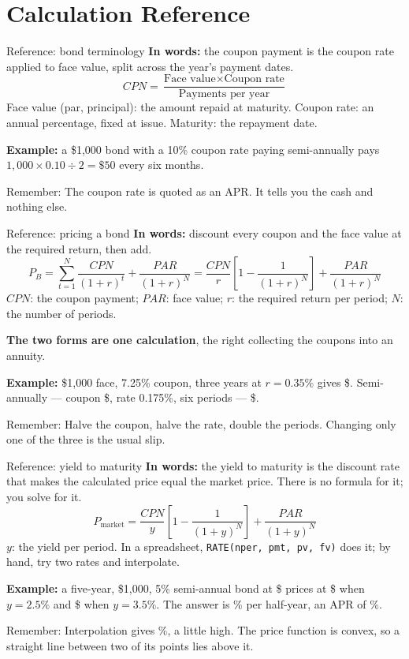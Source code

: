 \documentclass[10pt,aspectratio=169]{beamer}
\newcommand{\remember}[1]{\par\smallskip\alert{Remember:} #1}
\begin{document}
\section{Calculation Reference}

\begin{frame}[label=bondterms]{Reference: bond terminology}
\textbf{In words:} the coupon payment is the coupon rate applied to face value, split across the year's payment dates.
\[
CPN=\frac{\text{Face value}\times\text{Coupon rate}}{\text{Payments per year}}
\]
Face value (par, principal): the amount repaid at maturity. Coupon rate: an annual percentage, fixed at issue. Maturity: the repayment date.
\par\smallskip
\textbf{Example:} a \$1,000 bond with a 10\% coupon rate paying semi-annually pays $1{,}000\times0.10\div2=\$50$ every six months.
\remember{The coupon rate is quoted as an APR. It tells you the cash and nothing else.}
\end{frame}

\begin{frame}[label=bondprice]{Reference: pricing a bond}
\textbf{In words:} discount every coupon and the face value at the required return, then add.
\[
P_B=\sum_{t=1}^{N}\frac{CPN}{(1+r)^t}+\frac{PAR}{(1+r)^N}
=\frac{CPN}{r}\left[1-\frac{1}{(1+r)^N}\right]+\frac{PAR}{(1+r)^N}
\]
$CPN$: the coupon payment; $PAR$: face value; $r$: the required return per period; $N$: the number of periods.
\par\smallskip
\textbf{The two forms are one calculation}, the right collecting the coupons into an annuity.
\par\smallskip
\textbf{Example:} \$1,000 face, 7.25\% coupon, three years at $r=0.35\%$ gives \$\LExOnePrice. Semi-annually --- coupon \$\LExOneCouponSemi, rate 0.175\%, six periods --- \$\LExOnePriceSemi.
\remember{Halve the coupon, halve the rate, double the periods. Changing only one of the three is the usual slip.}
\end{frame}

\begin{frame}[label=ytm]{Reference: yield to maturity}
\textbf{In words:} the yield to maturity is the discount rate that makes the calculated price equal the market price. There is no formula for it; you solve for it.
\[
P_{\text{market}}=\frac{CPN}{y}\left[1-\frac{1}{(1+y)^N}\right]+\frac{PAR}{(1+y)^N}
\]
$y$: the yield per period. In a spreadsheet, \texttt{RATE(nper, pmt, pv, fv)} does it; by hand, try two rates and interpolate.
\par\smallskip
\textbf{Example:} a five-year, \$1,000, 5\% semi-annual bond at \$\LExTwoPrice{} prices at \$\LExTwoAtCoupon{} when $y=2.5\%$ and \$\LExTwoAtHigh{} when $y=3.5\%$. The answer is \LExTwoSemi\% per half-year, an APR of \LExTwoAPR\%.
\remember{Interpolation gives \LExTwoYTM\%, a little high. The price function is convex, so a straight line between two of its points lies above it.}
\end{frame}
\end{document}
